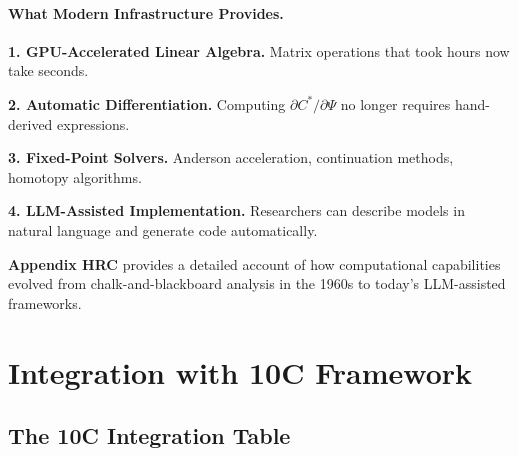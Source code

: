 \paragraph{What Modern Infrastructure Provides.}

\textbf{1. GPU-Accelerated Linear Algebra.}
Matrix operations that took hours now take seconds.

\textbf{2. Automatic Differentiation.}
Computing $\partial C^* / \partial \Psi$ no longer requires hand-derived expressions.

\textbf{3. Fixed-Point Solvers.}
Anderson acceleration, continuation methods, homotopy algorithms.

\textbf{4. LLM-Assisted Implementation.}
Researchers can describe models in natural language and generate code automatically.

\begin{cross-reference}
\textbf{Appendix HRC} provides a detailed account of how computational capabilities
evolved from chalk-and-blackboard analysis in the 1960s to today's LLM-assisted frameworks.
\end{cross-reference}



\section{Integration with 10C Framework}
\label{sec:comp-integration}


\subsection{The 10C Integration Table}

